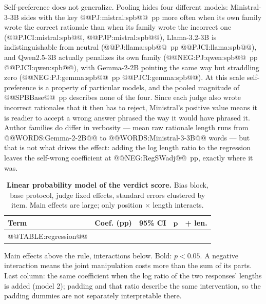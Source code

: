 \documentclass[conference]{IEEEtran}
\begin{document}
Self-preference does not generalize. Pooling hides four different models: Ministral-3-3B sides with the key @@PJ:mistral:spb@@~pp more often when its own family wrote the correct rationale than when its family wrote the incorrect one (@@PJCI:mistral:spb@@, @@PJP:mistral:spb@@), Llama-3.2-3B is indistinguishable from neutral (@@PJ:llama:spb@@~pp @@PJCI:llama:spb@@), and Qwen2.5-3B actually penalizes its own family (@@NEG:PJ:qwen:spb@@~pp @@PJCI:qwen:spb@@), with Gemma-2-2B pointing the same way but straddling zero (@@NEG:PJ:gemma:spb@@~pp @@PJCI:gemma:spb@@). At this scale self-preference is a property of particular models, and the pooled magnitude of @@SPBBase@@~pp describes none of the four. Since each judge also wrote incorrect rationales that it then has to reject, Ministral's positive value means it is readier to accept a wrong answer phrased the way it would have phrased it. Author families do differ in verbosity --- mean raw rationale length runs from @@WORDS:Gemma-2-2B@@ to @@WORDS:Ministral-3-3B@@ words --- but that is not what drives the effect: adding the log length ratio to the regression leaves the self-wrong coefficient at @@NEG:RegSWadj@@~pp, exactly where it was.

\begin{table}[t]
\centering
\footnotesize
\caption{\textbf{Linear probability model of the verdict score.} Bias block, base protocol, judge fixed effects, standard errors clustered by item. Main effects are large; only position $\times$ length interacts.}
\label{tab:linear-probability-model}
\setlength{\tabcolsep}{4pt}
\begin{threeparttable}
\begin{tabular}{@{}lrcrr@{}}
\toprule
\textbf{Term} & \textbf{Coef. (pp)} & \textbf{95\% CI} & \textbf{$\boldsymbol{p}$} & \textbf{+ len.} \\
\midrule
@@TABLE:regression@@
\bottomrule
\end{tabular}
\begin{tablenotes}[flushleft]
\scriptsize\raggedright
\item Main effects above the rule, interactions below. Bold: $p<0.05$. A negative interaction means the joint manipulation costs more than the sum of its parts. Last column: the same coefficient when the log ratio of the two responses' lengths is added (model 2); padding and that ratio describe the same intervention, so the padding dummies are not separately interpretable there.
\end{tablenotes}
\end{threeparttable}
\end{table}
\end{document}

